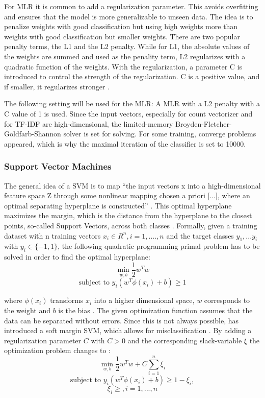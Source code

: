 \documentclass[12pt, a4paper, titlepage]{article}
\begin{document}
For \ac{MLR} it is common to add a regularization parameter. This avoids overfitting and ensures that the model is more generalizable to unseen data. The idea is to penalize weights with good classification but using high weights more than weights with good classification but smaller weights. There are two popular penalty terms, the L1 and the L2 penalty. While for L1, the absolute values of the weights are summed and used as the penality term, L2 regularizes with a quadratic function of the weights. With the regularization, a parameter C is introduced to control the strength of the regularization. C is a positive value, and if smaller, it regularizes stronger \citep{jurafsky2021}. 

The following setting will be used for the \ac{MLR}: A \ac{MLR} with a L2 penalty with a C value of 1 is used. Since the input vectors, especially for count vectorizer and for \ac{TF-IDF} are high-dimensional, the limited-memory Broyden-Fletcher-Goldfarb-Shannon solver is set for solving. For some training, converge problems appeared, which is why the maximal iteration of the classifier is set to 10000.

\subsubsection{Support Vector Machines}
 The general idea of a \ac{SVM} is to map ``the input vectors x into a high-dimensional feature space Z through some nonlinear mapping chosen a priori [...], where an optimal separating hyperplane is constructed'' \citep[138]{Vapnik2000}. This optimal hyperplane maximizes the margin, which is the distance from the hyperplane to the closest points, so-called Support Vectors, across both classes \citep{Han2012}. Formally, given a training dataset with n training vectors $x_i \in R^n, i = 1,....,n$ and the target classes $y_1,...y_i$ with $y_i \in \{-1, 1\}$, the following quadratic programming primal problem has to be solved in order to find the optimal hyperplane:
\[\min_{w,b} \frac{1}{2}w^{T}w \] 
\[\text{subject to } y_i(w^T\phi(x_i)+b) \geq 1\]

where $\phi(x_i)$ transforms $x_i$ into a higher dimensional space, $w$ corresponds to the weight and $b$ is the bias \citep{Chang2001,Jordan2006}.
The given optimization function assumes that the data can be separated without errors. Since this is not always possible, \cite{Cortes1995} has introduced a soft margin \ac{SVM}, which allows for misclassification \citep{Vapnik2000}.
By adding a regularization parameter $C$ with $C > 0$ and the corresponding slack-variable $\xi$ the optimization problem changes to \citep{Chang2001, Han2012}: 
\[\min_{w,b} \frac{1}{2}w^{T}w + C \sum_{i=1}^n \xi_i \] 
\[\text{subject to } y_i(w^T\phi(x_i)+b) \geq 1 - \xi_i, \] 
\[\xi_i \geq, i = 1,...,n\]
\end{document}
